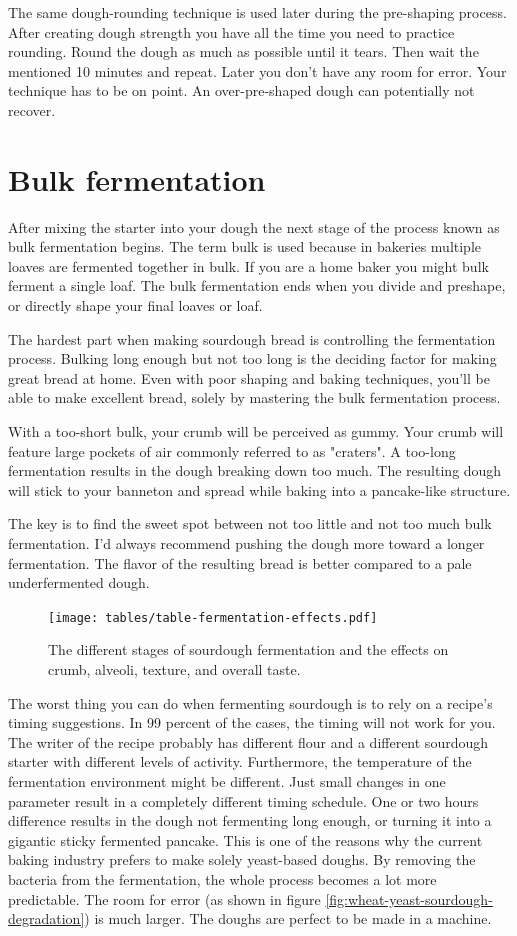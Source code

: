 The same dough-rounding technique is used later during
the pre-shaping process. After creating dough strength you
have all the time you need to practice rounding. Round the dough
as much as possible until it tears. Then wait the mentioned 10 minutes and repeat.
Later you don't have any room for error. Your technique has to be on point.
An over-pre-shaped dough can potentially not recover.


\section{Bulk fermentation}

After mixing the starter into your dough the next stage of
the process known as bulk fermentation begins. The term
bulk is used because in bakeries multiple loaves are fermented
together in bulk. If you are a home baker you might bulk
ferment a single loaf. The bulk fermentation ends when you
divide and preshape, or directly shape your final loaves or loaf.

The hardest part when making sourdough bread is controlling
the fermentation process. Bulking long enough but not too
long is the deciding factor for making great bread at home.
Even with poor shaping and baking techniques, you'll be able
to make excellent bread, solely by mastering the bulk
fermentation process.

With a too-short bulk, your crumb will be
perceived as gummy. Your crumb will feature large pockets of
air commonly referred to as "craters". A too-long fermentation
results in the dough breaking down too much. The resulting
dough will stick to your banneton and spread while baking
into a pancake-like structure.

The key is to find the sweet spot between not too little
and not too much bulk fermentation. I'd always recommend pushing
the dough more toward a longer fermentation. The
flavor of the resulting bread is better compared to a pale
underfermented dough.

\begin{figure}[!htb]
  \texttt{[image: tables/table-fermentation-effects.pdf]}
  \caption{The different stages of sourdough fermentation and the effects on crumb, alveoli, texture, and overall taste.}
\end{figure}

The worst thing you can do when fermenting sourdough
is to rely on a recipe's timing suggestions. In 99 percent
of the cases, the timing will not work for you. The writer
of the recipe probably has different flour and a different
sourdough starter with different levels of activity. Furthermore,
the temperature of the fermentation environment might be
different. Just small changes in one parameter result
in a completely different timing schedule. One or two hours
difference results in the dough not fermenting long enough, or
turning it into a gigantic sticky fermented pancake. This
is one of the reasons why the current baking industry prefers
to make solely yeast-based doughs. By removing the bacteria
from the fermentation, the whole process becomes a lot more
predictable. The room for error (as shown in figure \ref{fig:wheat-yeast-sourdough-degradation})
is much larger. The doughs are perfect to be made in a
machine.

